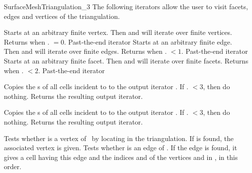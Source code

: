 \begin{ccRefConcept}{SurfaceMeshTriangulation_3}
The following iterators allow the user to visit facets, edges and vertices of the
triangulation.

{Starts at an arbitrary finite vertex. Then \ccc{++} and \ccc{--} will
iterate over finite vertices. Returns  when
\ccVar. $=0$.} 
\ccGlue
{}
{Past-the-end iterator}
\ccGlue
{}
{Starts at an arbitrary finite edge. Then \ccc{++} and \ccc{--} will
iterate over finite edges. Returns  when
\ccVar. $<1$.} 
\ccGlue
{}
{Past-the-end iterator}
\ccGlue
{}
{Starts at an arbitrary finite facet. Then \ccc{++} and \ccc{--} will
iterate over finite facets. Returns  when
\ccVar. $<2$.}
\ccGlue
{}
{Past-the-end iterator}

{Copies the s of all cells incident to  to the output
iterator .  If \ccVar. $<3$, then do nothing.
Returns the resulting output iterator.
}

{Copies the s of all cells incident to  to the output
iterator .  If \ccVar. $<3$, then do nothing.
Returns the resulting output iterator.}

{Tests whether  is a vertex of \ccVar\ by locating  in
the triangulation. If  is found, the associated vertex 
is given.}
\ccGlue
{}
{Tests whether  is an edge of \ccVar. If the edge is found,
it gives a cell  having this edge and the indices 
and  of the vertices  and  in , in this order.
}


\end{ccRefConcept}

